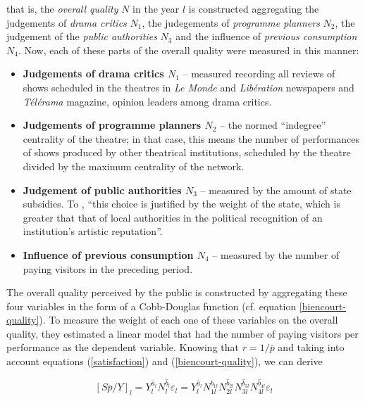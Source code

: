 \documentclass[a4paper, 12pt, openright, oneside, german, french, brazil, english]{abntex2}
\begin{document}
	that is, the \textit{overall quality} $N$ in the year $l$ is constructed aggregating the judgements of \textit{drama critics} $N_1$, the judegements of \textit{programme planners} $N_2$, the judgement of the \textit{public authorities} $N_3$ and the influence of \textit{previous consumption} $N_4$. Now, each of these parts of the overall quality were measured in this manner:
	
	
	\begin{itemize}
		\item \textbf{Judgements of drama critics $N_1$} -- measured recording all reviews of shows scheduled in the theatres in \textit{Le Monde} and \textit{Libération} newspapers and \textit{Télérama} magazine, opinion leaders among drama critics.
		
		\item \textbf{Judgements of programme planners $N_2$} -- the normed ``indegree'' centrality of the theatre; in that case, this means the number of performances of shows produced by other theatrical institutions, scheduled by the theatre divided by the maximum centrality of the network.
		
		\item \textbf{Judgement of public authorities $N_3$} -- measured by the amount of state subsidies. To , ``this choice is justified by the weight of the state, which is greater that that of local authorities in the political recognition of an institution's artistic reputation''.
		
		\item \textbf{Influence of previous consumption $N_4$} -- measured by the number of paying visitors in the preceding period.
	\end{itemize}
	
	The overall quality perceived by the public is constructed by aggregating these four variables in the form of a Cobb-Douglas function (cf. equation \ref{biencourt-quality}). To measure the weight of each one of these variables on the overall quality, they estimated a linear model that had the number of paying visitors per performance as the dependent variable. Knowing that $r = 1/\bar{p}$ and taking into account equations (\ref{satisfaction}) and (\ref{biencourt-quality}), we can derive
	
	\begin{equation}
	\label{biencourt-derivation}
		[S\bar{p}/Y]_l = Y_{l}^{\hat{a}_l} N_{l}^{\hat{b}_l} \varepsilon_l = Y_{l}^{\hat{a}_l} N_{1l}^{\hat{b}_{1l}} N_{2l}^{\hat{b}_{2l}} N_{3l}^{\hat{b}_{3l}} N_{4l}^{\hat{b}_{4l}} \varepsilon_l
	\end{equation}
	
\end{document}
